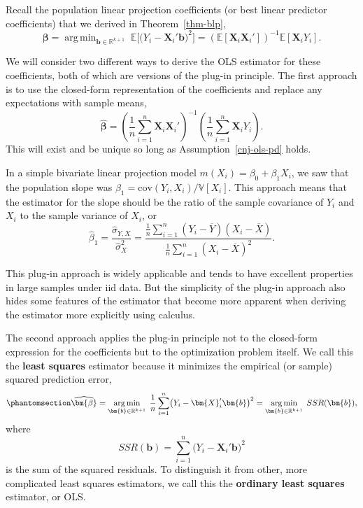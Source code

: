 \documentclass[
  13pt,
  letterpaper,
  DIV=11,
  numbers=noendperiod]{scrreprt}
\newcommand{\mb}{\bm}
\newcommand{\E}{\mathbb{E}}
\newcommand{\V}{\mathbb{V}}
\newcommand{\cov}{\text{cov}}
\newcommand{\Xbar}{\overline{X}}
\newcommand{\real}{\mathbb{R}}
\newcommand{\X}{\mb{X}}
\newcommand{\bfbeta}{\mb{\beta}}
\newcommand{\bhat}{\widehat{\mb{\beta}}}
\DeclareMathOperator*{\argmin}{arg\,min}
\theoremstyle{plain}
\theoremstyle{plain}
\theoremstyle{definition}
\theoremstyle{definition}
\theoremstyle{remark}
\begin{document}
Recall the population linear projection coefficients (or best linear
predictor coefficients) that we derived in Theorem~\ref{thm-blp}, \[ 
\bfbeta = \argmin_{\mb{b} \in \real^{k+1}}\; \E\bigl[ \bigl(Y_{i} - \mb{X}_{i}'\mb{b} \bigr)^2\bigr] = \left(\E[\X_{i}\X_{i}']\right)^{-1}\E[\X_{i}Y_{i}].
\]

We will consider two different ways to derive the OLS estimator for
these coefficients, both of which are versions of the plug-in principle.
The first approach is to use the closed-form representation of the
coefficients and replace any expectations with sample means, \[ 
\bhat = \left(\frac{1}{n} \sum_{i=1}^n \X_i\X_i' \right)^{-1} \left(\frac{1}{n} \sum_{i=1}^n \X_{i}Y_{i} \right).
\] This will exist and be unique so long as Assumption~\ref{cnj-ols-pd}
holds.

In a simple bivariate linear projection model
\(m(X_{i}) = \beta_0 + \beta_1X_{i}\), we saw that the population slope
was \(\beta_1= \cov(Y_{i},X_{i})/ \V[X_{i}]\). This approach means that
the estimator for the slope should be the ratio of the sample covariance
of \(Y_i\) and \(X_i\) to the sample variance of \(X_i\), or \[ 
\widehat{\beta}_{1} = \frac{\widehat{\sigma}_{Y,X}}{\widehat{\sigma}^{2}_{X}} = \frac{ \frac{1}{n}\sum_{i=1}^{n} (Y_{i} - \overline{Y})(X_{i} - \overline{X})}{\frac{1}{n} \sum_{i=1}^{n} (X_{i} - \Xbar)^{2}}.
\]

This plug-in approach is widely applicable and tends to have excellent
properties in large samples under iid data. But the simplicity of the
plug-in approach also hides some features of the estimator that become
more apparent when deriving the estimator more explicitly using
calculus.

The second approach applies the plug-in principle not to the closed-form
expression for the coefficients but to the optimization problem itself.
We call this the \textbf{least squares} estimator because it minimizes
the empirical (or sample) squared prediction error,
\begin{equation}\protect\phantomsection\label{eq-ols-objective}{ 
\bhat = \argmin_{\mb{b} \in \real^{k+1}}\; \frac{1}{n} \sum_{i=1}^{n}\bigl(Y_{i} - \mb{X}_{i}'\mb{b} \bigr)^2 = \argmin_{\mb{b} \in \real^{k+1}}\; SSR(\mb{b}),
}\end{equation} where \[ 
SSR(\mb{b}) = \sum_{i=1}^{n}\bigl(Y_{i} - \mb{X}_{i}'\mb{b} \bigr)^2
\] is the sum of the squared residuals. To distinguish it from other,
more complicated least squares estimators, we call this the
\textbf{ordinary least squares} estimator, or OLS.
\end{document}
